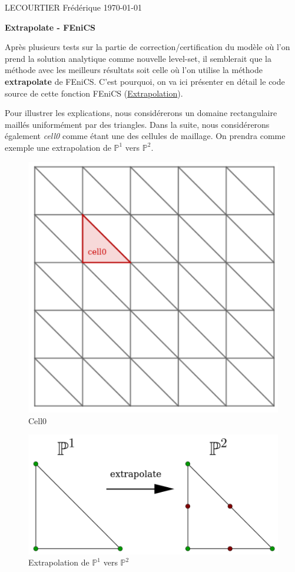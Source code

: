 \documentclass[french]{article}
\begin{document}
	LECOURTIER Frédérique \hfill \today
	\begin{center}
		\Large\textbf{{Extrapolate - FEniCS}}\\
	\end{center}
	\graphicspath{{images/}}

	Après plusieurs tests sur la partie de correction/certification du modèle où l'on prend la solution analytique comme nouvelle level-set, il semblerait que la méthode avec les meilleurs résultats soit celle où l'on utilise la méthode \textbf{extrapolate} de FEniCS. C'est pourquoi, on va ici présenter en détail le code source de cette fonction FEniCS (\href{https://fenics.readthedocs.io/projects/dolfin/en/2017.2.0/apis/api_adaptivity.html#extrapolation}{Extrapolation}).
	
	Pour illustrer les explications, nous considérerons un domaine rectangulaire maillés uniformément par des triangles. Dans la suite, nous considérerons également \textit{cell0} comme étant une des cellules de maillage. On prendra comme exemple une extrapolation de $\mathbb{P}^1$ vers $\mathbb{P}^2$. 
	
	\begin{minipage}{0.48\linewidth}
		\begin{figure}[H]
			\centering
			\includegraphics[width=0.5\linewidth]{cell0.png}
			\caption{Cell0}
		\end{figure}
	\end{minipage}
	\begin{minipage}{0.48\linewidth}
		\begin{figure}[H]
			\centering
			\includegraphics[width=0.9\linewidth]{P1toP2.png}
			\caption{Extrapolation de $\mathbb{P}^1$ vers $\mathbb{P}^2$}
		\end{figure}
	\end{minipage} \; \\
\end{document}
